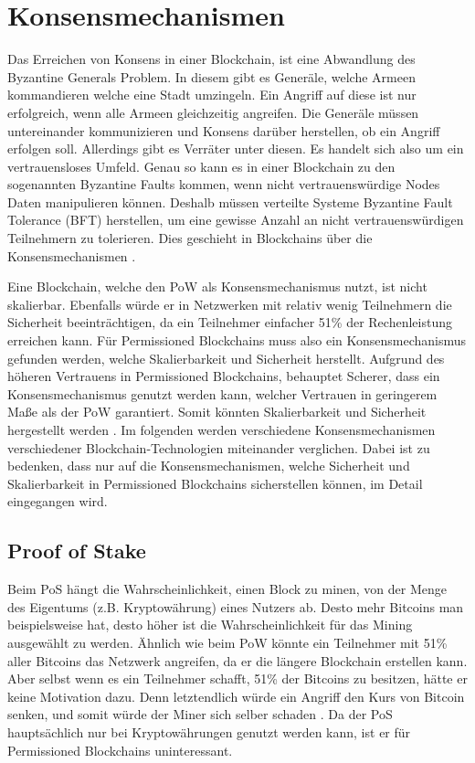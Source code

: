 \section{Konsensmechanismen}
\label{sec:eval-konsens}
Das Erreichen von Konsens in einer Blockchain, ist eine Abwandlung des Byzantine Generals Problem. In diesem gibt es Generäle, welche Armeen kommandieren welche eine Stadt umzingeln. Ein Angriff auf diese ist nur erfolgreich, wenn alle Armeen gleichzeitig angreifen. Die Generäle müssen untereinander kommunizieren und Konsens darüber herstellen, ob ein Angriff erfolgen soll. Allerdings gibt es Verräter unter diesen. Es handelt sich also um ein vertrauensloses Umfeld. Genau so kann es in einer Blockchain zu den sogenannten Byzantine Faults kommen, wenn nicht vertrauenswürdige Nodes Daten manipulieren können. Deshalb müssen verteilte Systeme Byzantine Fault Tolerance (BFT) herstellen, um eine gewisse Anzahl an nicht vertrauenswürdigen Teilnehmern zu tolerieren. Dies geschieht in Blockchains über die Konsensmechanismen \cite{ZhengBlockchainChallengesOpportunities2017}.

Eine Blockchain, welche den PoW als Konsensmechanismus nutzt, ist nicht skalierbar. Ebenfalls würde er in Netzwerken mit relativ wenig Teilnehmern die Sicherheit beeinträchtigen, da ein Teilnehmer einfacher 51\% der Rechenleistung erreichen kann. Für Permissioned Blockchains muss also ein Konsensmechanismus gefunden werden, welche Skalierbarkeit und Sicherheit herstellt. Aufgrund des höheren Vertrauens in Permissioned Blockchains, behauptet Scherer, dass ein Konsensmechanismus genutzt werden kann, welcher Vertrauen in geringerem Maße als der PoW garantiert. Somit könnten Skalierbarkeit und Sicherheit hergestellt werden \cite{SchererPerformanceScalabilityBlockchain2017}. Im folgenden werden verschiedene Konsensmechanismen verschiedener Blockchain-Technologien miteinander verglichen. Dabei ist zu bedenken, dass nur auf die Konsensmechanismen, welche Sicherheit und Skalierbarkeit in Permissioned Blockchains sicherstellen können, im Detail eingegangen wird.

\subsection{Proof of Stake}
Beim PoS hängt die Wahrscheinlichkeit, einen Block zu minen, von der Menge des Eigentums (z.B. Kryptowährung) eines Nutzers ab. Desto mehr Bitcoins man beispielsweise hat, desto höher ist die Wahrscheinlichkeit für das Mining ausgewählt zu werden. Ähnlich wie beim PoW könnte ein Teilnehmer mit 51\% aller Bitcoins das Netzwerk angreifen, da er die längere Blockchain erstellen kann. Aber selbst wenn es ein Teilnehmer schafft, 51\% der Bitcoins zu besitzen, hätte er keine Motivation dazu. Denn letztendlich würde ein Angriff den Kurs von Bitcoin senken, und somit würde der Miner sich selber schaden \cite{ZhengBlockchainChallengesOpportunities2017}. Da der PoS hauptsächlich nur bei Kryptowährungen genutzt werden kann, ist er für Permissioned Blockchains uninteressant.

